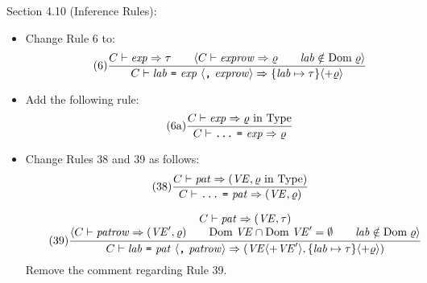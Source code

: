 \documentclass[twoside,titlepage]{article}
\begin{document}
\begin{appendix}
Section 4.10 (Inference Rules):
\begin{itemize}
\item Change Rule 6 to: 
  \begin{equation}
  \tag{6}
  \frac{
  C \vdash \mathit{exp} \Rightarrow \tau
  \qquad
  \langle C \vdash \mathit{exprow} \Rightarrow \varrho
  \qquad
  \mathit{lab} \notin \mbox{Dom}\; \varrho \rangle
  }{
  C \vdash \mathit{lab}~\mbox{\tt=}~\mathit{exp}~\langle\mbox{\tt,}~\mathit{exprow}\rangle
    \Rightarrow \{\mathit{lab} \mapsto \tau \} \langle+ \varrho\rangle
  }
  \end{equation}

\item Add the following rule: 
  \begin{equation}
  \tag{6a}
  \frac{
  C \vdash \mathit{exp} \Rightarrow \mbox{$\varrho$ in Type}
  }{
  C \vdash \mbox{\tt...}~\mbox{\tt=}~\mathit{exp} \Rightarrow \varrho
  }
  \end{equation}

\item Change Rules 38 and 39 as follows: 
  \begin{equation}
  \tag{38}
  \frac{
  C \vdash \mathit{pat} \Rightarrow (\mathit{VE}, \mbox{$\varrho$ in Type})
  }{
  C \vdash \mbox{\tt...}~\mbox{\tt=}~\mathit{pat} \Rightarrow (\mathit{VE}, \varrho)
  }
  \end{equation}

  \begin{equation}
  \tag{39}
  \frac{
  \begin{array}{@{}c@{}}
  C \vdash \mathit{pat} \Rightarrow (\mathit{VE}, \tau)
  \\
  \langle C \vdash \mathit{patrow} \Rightarrow (\mathit{VE}', \varrho)
  \qquad
  \mbox{Dom}\; \mathit{VE} \cap \mbox{Dom}\; \mathit{VE}' = \emptyset
  \qquad
  \mathit{lab} \notin \mbox{Dom}\; \varrho \rangle
  \end{array}
  }{
  C \vdash \mathit{lab}~\mbox{\tt=}~\mathit{pat}~\langle\mbox{\tt,}~\mathit{patrow}\rangle
    \Rightarrow (\mathit{VE} \langle+ \mathit{VE}'\rangle, \{\mathit{lab} \mapsto \tau \} \langle+ \varrho\rangle)
  }
  \end{equation}
  Remove the comment regarding Rule 39.


\end{itemize}
\end{appendix}
\end{document}
